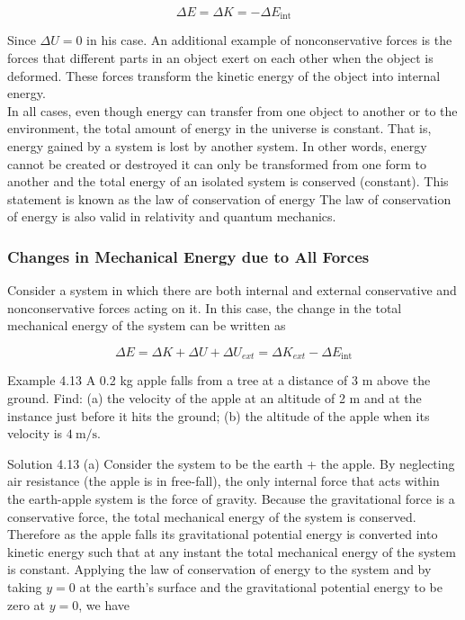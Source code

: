 \documentclass[10pt]{article}
\numberwithin{equation}{section}
\begin{document}
$$
\Delta E=\Delta K=-\Delta E_{\mathrm{int}}
$$

Since $\Delta U=0$ in his case. An additional example of nonconservative forces is the forces that different parts in an object exert on each other when the object is deformed. These forces transform the kinetic energy of the object into internal energy.\\
In all cases, even though energy can transfer from one object to another or to the environment, the total amount of energy in the universe is constant. That is, energy gained by a system is lost by another system. In other words, energy cannot be created or destroyed it can only be transformed from one form to another and the total energy of an isolated system is conserved (constant). This statement is known as the law of conservation of energy The law of conservation of energy is also valid in relativity and quantum mechanics.

\subsubsection{Changes in Mechanical Energy due to All Forces}\label{sec:4-5-4}
Consider a system in which there are both internal and external conservative and nonconservative forces acting on it. In this case, the change in the total mechanical energy of the system can be written as

$$
\Delta E=\Delta K+\Delta U+\Delta U_{e x t}=\Delta K_{e x t}-\Delta E_{\mathrm{int}}
$$

Example 4.13 A 0.2 kg apple falls from a tree at a distance of 3 m above the ground. Find: (a) the velocity of the apple at an altitude of 2 m and at the instance just before it hits the ground; (b) the altitude of the apple when its velocity is $4 \mathrm{~m} / \mathrm{s}$.

Solution 4.13 (a) Consider the system to be the earth + the apple. By neglecting air resistance (the apple is in free-fall), the only internal force that acts within the earth-apple system is the force of gravity. Because the gravitational force is a conservative force, the total mechanical energy of the system is conserved. Therefore as the apple falls its gravitational potential energy is converted into kinetic energy such that at any instant the total mechanical energy of the system is constant. Applying the law of conservation of energy to the system and by taking $y=0$ at the earth's surface and the gravitational potential energy to be zero at $y=0$, we have
\end{document}
